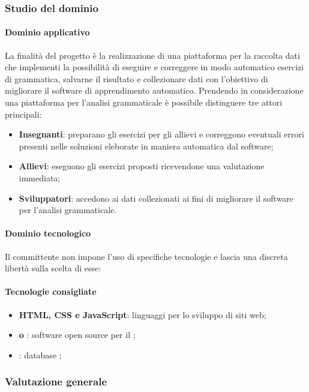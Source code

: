 	\subsubsection{Studio del dominio}
	\paragraph{Dominio applicativo} \Spazio
	La finalità del progetto è la realizzazione di una piattaforma per la raccolta dati che implementi la possibilità di eseguire e correggere in modo automatico esercizi di grammatica, salvarne il risultato e collezionare dati con l'obiettivo di migliorare il software di apprendimento automatico.
	Prendendo in considerazione una piattaforma per l'analisi grammaticale è possibile distinguere tre attori principali:
	\begin{itemize} 
	\item \textbf{Insegnanti}: preparano gli esercizi per gli allievi e correggono eventuali errori presenti nelle soluzioni eleborate in maniera automatica dal software;
	\item \textbf{Allievi}: eseguono gli esercizi proposti ricevendone una valutazione immediata;
	\item \textbf{Sviluppatori}: accedono ai dati collezionati ai fini di migliorare il software per l'analisi grammaticale.
	\end{itemize}
	\paragraph{Dominio tecnologico} \Spazio
	Il committente non impone l'uso di specifiche tecnologie e lascia una discreta libertà sulla scelta di esse:
	\paragraph{Tecnologie consigliate}
	\begin{itemize}
		\item \textbf{HTML, CSS e JavaScript}: linguaggi per lo sviluppo di siti web;
		\item \textbf{ o }: software open source per il ;
		\item  \textbf{}: database ;
	\end{itemize}
	\subsubsection{Valutazione generale}

